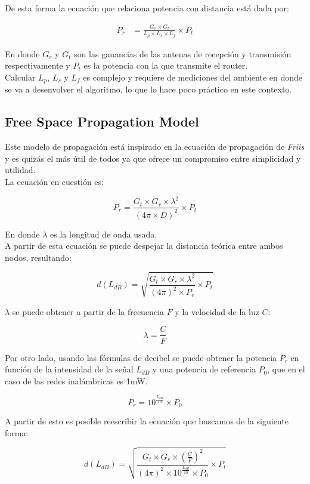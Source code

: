 \documentclass[journal]{IEEEtran}
\begin{document}
De esta forma la ecuación que relaciona potencia con distancia está dada por:

\begin{align*}
P_r &= {\frac {G_r \times G_t} {L_p \times L_s \times L_f}} \times P_t
\end{align*}

En donde $G_r$ y $G_t$ son las ganancias de las antenas de recepción y transmisión respectivamente y $P_t$ es la potencia con la que transmite el router.\\

Calcular $L_p$, $L_s$ y $L_f$ es complejo y requiere de mediciones del ambiente en donde se va a desenvolver el algoritmo, lo que lo hace poco práctico en este contexto.

\subsection{Free Space Propagation Model}

Este modelo de propagación está inspirado en la ecuación de propagación de \emph{Friis} \cite{friis:transmission:equation} y es quizás el más útil de todos ya que ofrece un compromiso entre simplicidad y utilidad.\\

La ecuación en cuestión es:

$$P_r = \frac {G_t \times G_r \times \lambda^2} {(4 \pi \times D)^2} \times P_t$$

En donde $\lambda$ es la longitud de onda usada.\\

A partir de esta ecuación se puede despejar la distancia teórica entre ambos nodos, resultando:

$$d(L_{dB}) = \sqrt {\frac {G_t \times G_r \times \lambda^2} {(4 \pi)^2 \times P_r} \times P_t}$$

$\lambda$ se puede obtener a partir de la frecuencia $F$ y la velocidad de la luz $C$:

$$\lambda = \frac {C} {F}$$

Por otro lado, usando las fórmulas de decibel se puede obtener la potencia $P_r$ en función de la intensidad de la señal $L_{dB}$ y una potencia de referencia $P_0$, que en el caso de las redes inalámbricas es 1mW.

$$P_r = 10^{\frac {L_{dB}} {10}} \times P_0$$

A partir de esto es posible reescribir la ecuación que buscamos de la siguiente forma:

$$d(L_{dB}) = \sqrt {\frac {G_t \times G_r \times (\frac {C} {F})^2} {(4 \pi)^2 \times 10^{\frac {L_{dB}} {10}} \times P_0} \times P_t}$$
\end{document}
